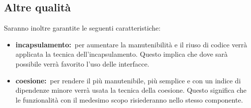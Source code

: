 	\subsection{Altre qualità}
		Saranno inoltre garantite le seguenti caratteristiche:
		\begin{itemize}
			\item \textbf{incapsulamento:}\ per aumentare la manutenibilità e il riuso di codice verrà applicata la tecnica dell'incapsulamento. Questo implica che dove sarà possibile verrà favorito l'uso delle interfacce.
			\item \textbf{coesione:}\ per rendere il  più manutenibile, più semplice e con un indice di dipendenze minore verrà usata la tecnica della coesione. Questo significa che le funzionalità con il medesimo scopo risiederanno nello stesso componente.
		\end{itemize}
